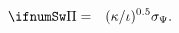 \begin{eqnarray*}
\ifnumSw \Pi & = &  (\kappa/\iota)^{0.5} \sigma_{\Psi}. \label{eq:bestPi}
\end{eqnarray*}
